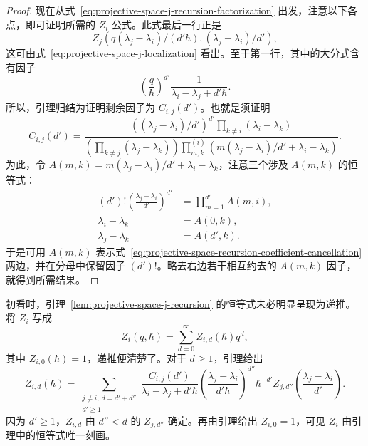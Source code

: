\begin{proof}
现在从式~\eqref{eq:projective-space-j-recursion-factorization} 出发，注意以下各点，即可证明所需的 $Z_i$ 公式。此式最后一行正是
\[
Z_j\left(q(\lambda_j-\lambda_i)/(d'\hbar),(\lambda_j-\lambda_i)/d'\right),
\]
这可由式~\eqref{eq:projective-space-j-localization} 看出。至于第一行，其中的大分式含有因子
\[
\left(\frac q\hbar\right)^{d'}\frac1{\lambda_i-\lambda_j+d'\hbar}.
\]
所以，引理归结为证明剩余因子为 $C_{i,j}(d')$。也就是须证明
\begin{equation}\label{eq:projective-space-recursion-coefficient-cancellation}
C_{i,j}(d')=\frac{((\lambda_j-\lambda_i)/d')^{d'}\prod_{k\ne i}(\lambda_i-\lambda_k)}{\left(\prod_{k\ne j}(\lambda_j-\lambda_k)\right)\prod_{m,k}^{(i)}(m(\lambda_j-\lambda_i)/d'+\lambda_i-\lambda_k)}.
\end{equation}
为此，令 $A(m,k)=m(\lambda_j-\lambda_i)/d'+\lambda_i-\lambda_k$，注意三个涉及 $A(m,k)$ 的恒等式：
\[
\begin{aligned}
(d')!\left(\frac{\lambda_j-\lambda_i}{d'}\right)^{d'}&=\prod_{m=1}^{d'}A(m,i),\\
\lambda_i-\lambda_k&=A(0,k),\\
\lambda_j-\lambda_k&=A(d',k).
\end{aligned}
\]
于是可用 $A(m,k)$ 表示式~\eqref{eq:projective-space-recursion-coefficient-cancellation} 两边，并在分母中保留因子 $(d')!$。略去右边若干相互约去的 $A(m,k)$ 因子，就得到所需结果。
\end{proof}
初看时，引理~\ref{lem:projective-space-j-recursion} 的恒等式未必明显呈现为递推。将 $Z_i$ 写成
\[
Z_i(q,\hbar)=\sum_{d=0}^{\infty}Z_{i,d}(\hbar)q^d,
\]
其中 $Z_{i,0}(\hbar)=1$，递推便清楚了。对于 $d\ge1$，引理给出
\[
Z_{i,d}(\hbar)=\sum_{\substack{j\ne i,\ d=d'+d''\\d'\ge1}}
\frac{C_{i,j}(d')}{\lambda_i-\lambda_j+d'\hbar}
\left(\frac{\lambda_j-\lambda_i}{d'\hbar}\right)^{d''}\hbar^{-d'}
Z_{j,d''}\left(\frac{\lambda_j-\lambda_i}{d'}\right).
\]
因为 $d'\ge1$，$Z_{i,d}$ 由 $d''<d$ 的 $Z_{j,d''}$ 确定。再由引理给出 $Z_{i,0}=1$，可见 $Z_i$ 由引理中的恒等式唯一刻画。

